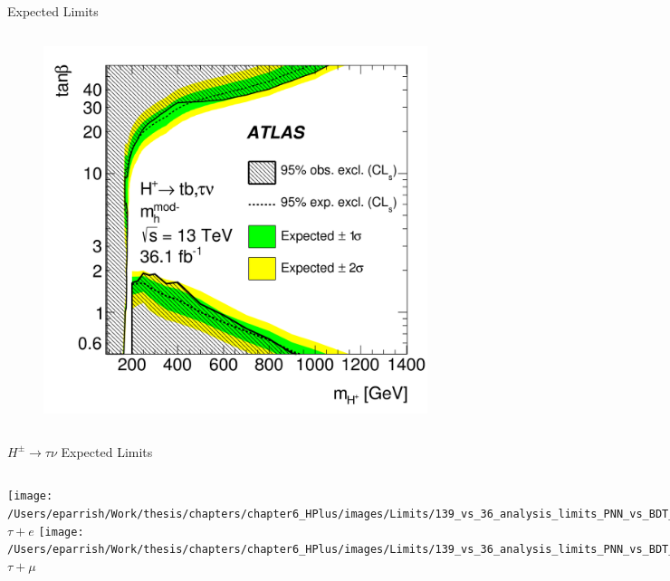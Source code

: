 \documentclass[aspectratio=169,xcolor=table]{beamer}
\begin{document}
\begin{frame}{\Hpm Expected Limits}
\begin{columns}
      \begin{figure}
      \centering
      \includegraphics[width=\textwidth,keepaspectratio=true]{HPlus_taunu_tb_tanb_Limits_hMod.png}
      \caption{\tiny \cite{ATLAS-HPlus-tb-36ifb}}
      \end{figure}
    \end{columns}
  \end{frame}

  \begin{frame}{$H^{\pm} \rightarrow \tau\nu$ Expected Limits}
    \centering
    \small
    \begin{columns}
      \centering
      \texttt{[image: /Users/eparrish/Work/thesis/chapters/chapter6\_HPlus/images/Limits/139\_vs\_36\_analysis\_limits\_PNN\_vs\_BDT\_TauEl\_logx.png]} \\
      \centering
      $\tau+e$
      \texttt{[image: /Users/eparrish/Work/thesis/chapters/chapter6\_HPlus/images/Limits/139\_vs\_36\_analysis\_limits\_PNN\_vs\_BDT\_TauMu\_logx.png]}\\
      \centering
      $\tau+\mu$
    \end{columns}
  \end{frame}
\end{document}
